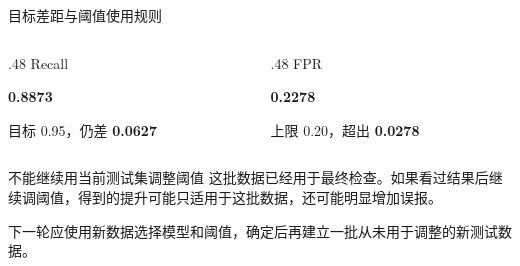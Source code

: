 \documentclass[aspectratio=169,10pt]{beamer}
\begin{document}
\begin{frame}{目标差距与阈值使用规则}
  \begin{columns}[T,onlytextwidth]
    \begin{column}{.48\textwidth}
      \centering
      {\small Recall}

      \vspace{.25em}
      {\color{seugreen}\Huge\bfseries 0.8873}

      \vspace{.15em}
      目标 0.95，仍差 \textbf{0.0627}
    \end{column}
    \begin{column}{.48\textwidth}
      \centering
      {\small FPR}

      \vspace{.25em}
      {\color{seugreen}\Huge\bfseries 0.2278}

      \vspace{.15em}
      上限 0.20，超出 \textbf{0.0278}
    \end{column}
  \end{columns}

  \vspace{1em}
  \begin{alertblock}{不能继续用当前测试集调整阈值}
    这批数据已经用于最终检查。如果看过结果后继续调阈值，得到的提升可能只适用于这批数据，还可能明显增加误报。
  \end{alertblock}

  \vfill
  \centering
  下一轮应使用新数据选择模型和阈值，确定后再建立一批从未用于调整的新测试数据。
\end{frame}
\end{document}
